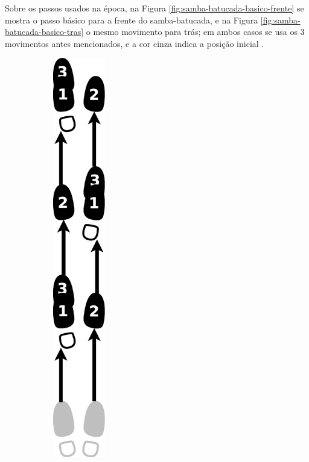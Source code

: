 \begin{itemize}
Sobre os passos usados na época, 
na Figura \ref{fig:samba-batucada-basico-frente} se mostra o passo básico para a frente do samba-batucada,
e na  Figura \ref{fig:samba-batucada-basico-tras} o mesmo movimento para trás;
em ambos casos se usa os 3 movimentos antes mencionados, e a cor cinza indica a posição inicial \cite[pp. 61-62]{fornaciari1947aprender} \cite[pp. 63]{freitas1959danca}. 
\begin{figure}[h]
    \centering
    \begin{subfigure}[b]{0.4\textwidth}
        \centering
        \includegraphics[width=0.25\textwidth]{chapters/cap-historia-sambagafieira/samba-batucada-basico-frente.eps}

\end{subfigure}
\end{figure}
\end{itemize}
